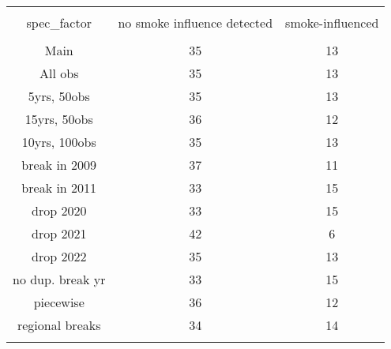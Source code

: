
\begin{table}[!htbp] \centering 
  \caption{} 
  \label{table:extremes_smokeinfluence} 
\footnotesize 
\begin{tabular}{@{\extracolsep{5pt}} ccc} 
\\[-1.8ex]\hline 
\hline \\[-1.8ex] 
spec\_factor & no smoke influence detected & smoke-influenced \\ 
\hline \\[-1.8ex] 
Main & 35 & 13 \\ 
All obs & 35 & 13 \\ 
5yrs, 50obs & 35 & 13 \\ 
15yrs, 50obs & 36 & 12 \\ 
10yrs, 100obs & 35 & 13 \\ 
break in 2009 & 37 & 11 \\ 
break in 2011 & 33 & 15 \\ 
drop 2020 & 33 & 15 \\ 
drop 2021 & 42 & 6 \\ 
drop 2022 & 35 & 13 \\ 
no dup. break yr & 33 & 15 \\ 
piecewise & 36 & 12 \\ 
regional breaks & 34 & 14 \\ 
\hline \\[-1.8ex] 
\end{tabular} 
\end{table} 
